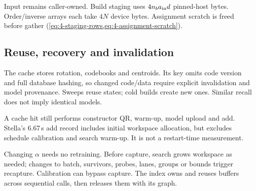Input remains caller-owned. Build staging uses $4n_ba_{\rm in}d$ pinned-host bytes. Order/inverse arrays each take $4N$ device bytes. Assignment scratch is freed before gather (\cref{eq:4-staging-rows,eq:4-assignment-scratch}).

\subsection{Reuse, recovery and invalidation}

The cache stores rotation, codebooks and centroids. Its key omits code version and full database hashing, so changed code/data require explicit invalidation and model provenance. Sweeps reuse states; cold builds create new ones. Similar recall does not imply identical models.

A cache hit still performs constructor QR, warm-up, model upload and add. Stella's 6.67\,s add record includes initial workspace allocation, but excludes schedule calibration and search warm-up. It is not a restart-time measurement.

Changing $\alpha$ needs no retraining. Before capture, search grows workspace as needed; changes to batch, survivors, probes, lanes, groups or bounds trigger recapture. Calibration can bypass capture. The index owns and reuses buffers across sequential calls, then releases them with its graph.